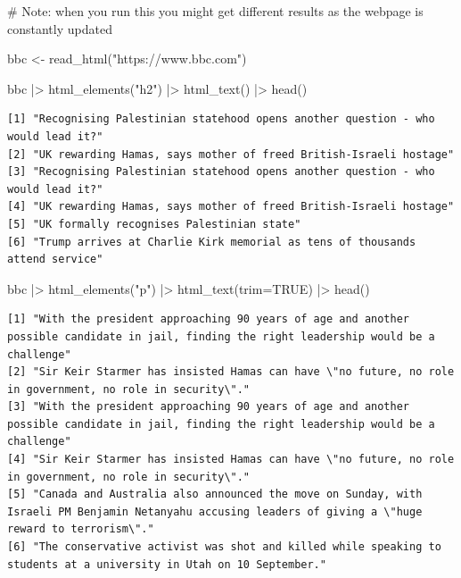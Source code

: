 \documentclass[
  letterpaper,
  DIV=11,
  numbers=noendperiod]{scrreprt}
\newenvironment{Shaded}{\begin{snugshade}}{\end{snugshade}}
\newcommand{\AttributeTok}[1]{\textcolor[rgb]{0.40,0.45,0.13}{#1}}
\newcommand{\CommentTok}[1]{\textcolor[rgb]{0.37,0.37,0.37}{#1}}
\newcommand{\ConstantTok}[1]{\textcolor[rgb]{0.56,0.35,0.01}{#1}}
\newcommand{\FunctionTok}[1]{\textcolor[rgb]{0.28,0.35,0.67}{#1}}
\newcommand{\NormalTok}[1]{\textcolor[rgb]{0.00,0.23,0.31}{#1}}
\newcommand{\OtherTok}[1]{\textcolor[rgb]{0.00,0.23,0.31}{#1}}
\newcommand{\SpecialCharTok}[1]{\textcolor[rgb]{0.37,0.37,0.37}{#1}}
\newcommand{\StringTok}[1]{\textcolor[rgb]{0.13,0.47,0.30}{#1}}
\begin{document}
\begin{Shaded}
\begin{Highlighting}[]
\CommentTok{\# Note: when you run this you might get different results as the webpage is constantly updated}

\NormalTok{bbc }\OtherTok{\textless{}{-}} \FunctionTok{read\_html}\NormalTok{(}\StringTok{"https://www.bbc.com"}\NormalTok{)}

\NormalTok{bbc }\SpecialCharTok{|\textgreater{}} \FunctionTok{html\_elements}\NormalTok{(}\StringTok{"h2"}\NormalTok{) }\SpecialCharTok{|\textgreater{}} \FunctionTok{html\_text}\NormalTok{() }\SpecialCharTok{|\textgreater{}} \FunctionTok{head}\NormalTok{()}
\end{Highlighting}
\end{Shaded}

\begin{verbatim}
[1] "Recognising Palestinian statehood opens another question - who would lead it?"
[2] "UK rewarding Hamas, says mother of freed British-Israeli hostage"             
[3] "Recognising Palestinian statehood opens another question - who would lead it?"
[4] "UK rewarding Hamas, says mother of freed British-Israeli hostage"             
[5] "UK formally recognises Palestinian state"                                     
[6] "Trump arrives at Charlie Kirk memorial as tens of thousands attend service"   
\end{verbatim}

\begin{Shaded}
\begin{Highlighting}[]
\NormalTok{bbc }\SpecialCharTok{|\textgreater{}} \FunctionTok{html\_elements}\NormalTok{(}\StringTok{"p"}\NormalTok{) }\SpecialCharTok{|\textgreater{}} \FunctionTok{html\_text}\NormalTok{(}\AttributeTok{trim=}\ConstantTok{TRUE}\NormalTok{) }\SpecialCharTok{|\textgreater{}} \FunctionTok{head}\NormalTok{()}
\end{Highlighting}
\end{Shaded}

\begin{verbatim}
[1] "With the president approaching 90 years of age and another possible candidate in jail, finding the right leadership would be a challenge"             
[2] "Sir Keir Starmer has insisted Hamas can have \"no future, no role in government, no role in security\"."                                              
[3] "With the president approaching 90 years of age and another possible candidate in jail, finding the right leadership would be a challenge"             
[4] "Sir Keir Starmer has insisted Hamas can have \"no future, no role in government, no role in security\"."                                              
[5] "Canada and Australia also announced the move on Sunday, with Israeli PM Benjamin Netanyahu accusing leaders of giving a \"huge reward to terrorism\"."
[6] "The conservative activist was shot and killed while speaking to students at a university in Utah on 10 September."                                    
\end{verbatim}
\end{document}
